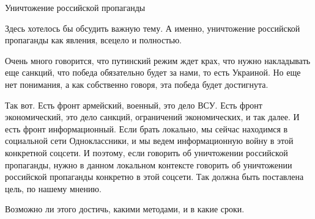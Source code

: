  
 
 
 
 

Уничтожение российской пропаганды

Здесь хотелось бы обсудить важную тему. А именно, уничтожение российской
пропаганды как явления, всецело и полностью.

Очень много говорится, что путинский режим ждет крах, что нужно накладывать еще
санкций, что победа обязательно будет за нами, то есть Украиной.  Но еще нет
понимания, а как собственно говоря, эта победа будет достигнута.

Так вот. Есть фронт армейский, военный, это дело ВСУ. Есть фронт экономический,
это дело санкций, ограничений экономических, и так далее. И есть фронт
информационный.  Если брать локально, мы сейчас находимся в социальной сети
Одноклассники, и мы ведем информационную войну в этой конкретной соцсети. И
поэтому, если говорить об уничтожении российской пропаганды, нужно в данном
локальном контексте говорить об уничтожении российской пропаганды конкретно в
этой соцсети. Так должна быть поставлена цель, по нашему мнению.

Возможно ли этого достичь, какими методами, и в какие сроки.

